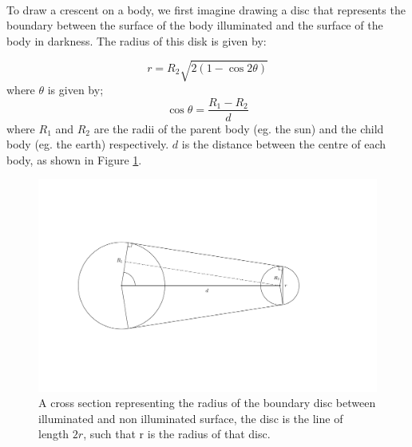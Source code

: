 \documentclass{article}
\begin{document}
	\paragraph{}To draw a crescent on a body, we first imagine drawing a disc that represents the boundary between the surface of the body illuminated and the surface of the body in darkness.
	The radius of this disk is given by:

	$$r = R_2\sqrt{2\left(1 - \cos{2\theta}\right)}$$
	where $\theta$ is given by;
	$$\cos{\theta} = \frac{R_1 - R_2}{d}$$
	where $R_1$ and $R_2$ are the radii of the parent body (eg. the sun) and the child body (eg. the earth) respectively. $d$ is the distance between the centre of each body, as shown in Figure \ref{fig:crescentRadius}.
\begin{figure}
	\includegraphics[width = 14cm]{CrescentRadius.pdf}
	\caption{A cross section representing the radius of the boundary disc between illuminated and non illuminated surface, the disc is the line of length $2r$, such that r is the radius of that disc.}
	\label{fig:crescentRadius}
\end{figure}
\end{document}
